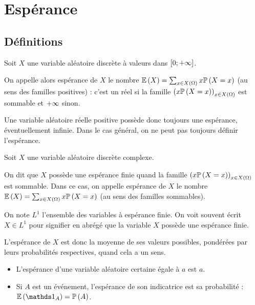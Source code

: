 \section{Espérance}

\subsection{Définitions}

\begin{defi}
Soit \(X\) une variable aléatoire discrète à valeurs dans \(\left[0;+\infty\right]\).

On appelle alors espérance de \(X\) le nombre \(\operatorname{\mathbb{E}}\left(X\right)=\sum_{x\in X\left(\Omega\right)}x\mathbb{P}\left(X=x\right)\) (au sens des familles positives) : c'est un réel si la famille \(\left(x\mathbb{P}\left(X=x\right)\right)_{x\in X\left(\Omega\right)}\) est sommable et \(+\infty\) sinon.
\end{defi}

Une variable aléatoire réelle positive possède donc toujours une espérance, éventuellement infinie. Dans le cas général, on ne peut pas toujours définir l'espérance.

\begin{defi}
Soit \(X\) une variable aléatoire discrète complexe.

On dit que \(X\) possède une espérance finie quand la famille \(\left(x\mathbb{P}\left(X=x\right)\right)_{x\in X\left(\Omega\right)}\) est sommable. Dans ce cas, on appelle espérance de \(X\) le nombre \(\operatorname{\mathbb{E}}\left(X\right)=\sum_{x\in X\left(\Omega\right)}x\mathbb{P}\left(X=x\right)\) (au sens des familles sommables).
\end{defi}

On note \(L^1\) l'ensemble des variables à espérance finie. On voit souvent écrit \(X\in L^1\) pour signifier en abrégé que la variable \(X\) possède une espérance finie.

L'espérance de \(X\) est donc la moyenne de ses valeurs possibles, pondérées par leurs probabilités respectives, quand cela a un sens.

\begin{ex}
\begin{itemize}
    \item L'espérance d'une variable aléatoire certaine égale à \(a\) est \(a\). \\
    \item Si \(A\) est un événement, l'espérance de son indicatrice est sa probabilité : \(\esp{\ind{A}}=\proba{A}\).
\end{itemize}
\end{ex}

